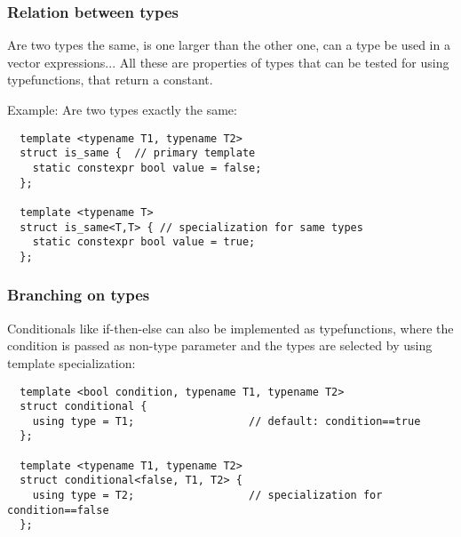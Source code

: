 \subsubsection{Relation between types}
Are two types the same, is one larger than the other one, can a type be used in a vector expressions... All these are properties of types that
can be tested for using typefunctions, that return a  constant.

Example: Are two types exactly the same:
\begin{verbatim}
  template <typename T1, typename T2>
  struct is_same {  // primary template
    static constexpr bool value = false;
  };

  template <typename T>
  struct is_same<T,T> { // specialization for same types
    static constexpr bool value = true;
  };
\end{verbatim}

\subsubsection{Branching on types}
Conditionals like if-then-else can also be implemented as typefunctions, where the condition is passed as non-type  parameter
and the types are selected by using template specialization:
\begin{verbatim}
  template <bool condition, typename T1, typename T2>
  struct conditional {
    using type = T1;                  // default: condition==true
  };

  template <typename T1, typename T2>
  struct conditional<false, T1, T2> {
    using type = T2;                  // specialization for condition==false
  };
\end{verbatim}
